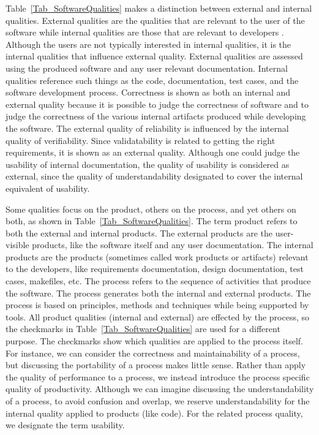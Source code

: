 \documentclass[letterpaper, cleveref]{lipics-v2019}
\theoremstyle{definition}
\begin{document}
Table~\ref{Tab_SoftwareQualities} makes a distinction between external and
internal qualities.  External qualities are the qualities that are relevant to
the user of the software while internal qualities are those that are relevant to
developers \citep[p.\ 16]{GhezziEtAl2003}.  Although the users are not typically
interested in internal qualities, it is the internal qualities that influence
external quality.  External qualities are assessed using the produced software
and any user relevant documentation.  Internal qualities reference such things
as the code, documentation, test cases, and the software development process.
Correctness is shown as both an internal and external quality because it is
possible to judge the correctness of software and to judge the correctness of
the various internal artifacts produced while developing the software.  The
external quality of reliability is influenced by the internal quality of
verifiability. Since validatability is related to getting the right
requirements, it is shown as an external quality.  Although one could judge the
usability of internal documentation, the quality of usability is considered as
external, since the quality of understandability designated to cover the internal
equivalent of usability.

Some qualities focus on the product, others on the process, and yet others on
both, as shown in Table~\ref{Tab_SoftwareQualities}.  The term product refers to
both the external and internal products.  The external products are the
user-visible products, like the software itself and any user documentation.  The
internal products are the products (sometimes called work products or artifacts)
relevant to the developers, like requirements documentation, design
documentation, test cases, makefiles, etc.  The process refers to the sequence
of activities that produce the software.  The process generates both the
internal and external products.  The process is based on principles, methods and
techniques while being supported by tools.  All product qualities (internal and
external) are effected by the process, so the checkmarks in
Table~\ref{Tab_SoftwareQualities} are used for a different purpose.  The
checkmarks show which qualities are applied to the process itself.  For
instance, we can consider the correctness and maintainability of a process, but
discussing the portability of a process makes little sense. Rather than apply
the quality of performance to a process, we instead introduce the process
specific quality of productivity.  Although we can imagine discussing the
understandability of a process, to avoid confusion and overlap, we reserve
understandability for the internal quality applied to products (like code). For
the related process quality, we designate the term usability.
\end{document}
